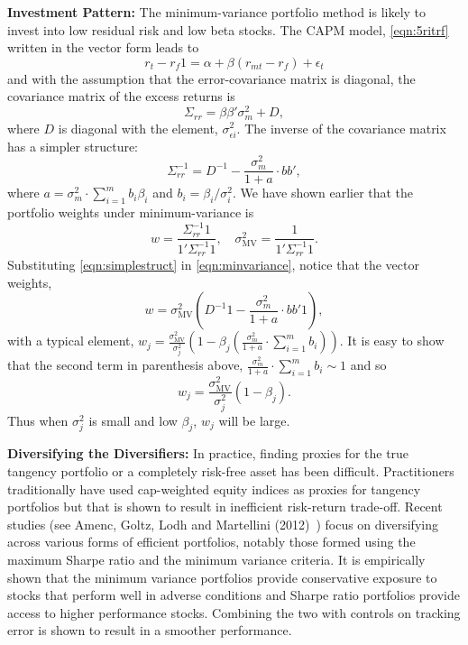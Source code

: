 \noindent\textbf{Investment Pattern:} The minimum-variance portfolio method is likely to invest into low residual risk and low beta stocks. The CAPM model, \eqref{eqn:5ritrf} written in the vector form leads to
	\begin{equation}\label{eqn:vectorform}
	r_t - r_f 1 = \alpha + \beta(r_{mt} - r_f) + \epsilon_t
	\end{equation}
and with the assumption that the error-covariance matrix is diagonal, the covariance matrix of the excess returns is
	\begin{equation}\label{eqn:Sigmarr}
	\Sigma_{rr}= \beta\beta' \sigma_m^2 + D,
	\end{equation}	
where $D$ is diagonal with the element, $\sigma_{\epsilon i}^2$. The inverse of the covariance matrix has a simpler structure:
	\begin{equation}\label{eqn:simplestruct}
	\Sigma_{rr}^{-1}= D^{-1} - \dfrac{\sigma_m^2}{1+a} \cdot bb',
	\end{equation}	
where $a=\sigma_m^2 \cdot \sum_{i=1}^m b_i \beta_i$ and $b_i= \beta_i/\sigma_i^2$. We have shown earlier that the portfolio weights under minimum-variance is
	\begin{equation} \label{eqn:minvariance}
	w= \dfrac{\Sigma_{rr}^{-1} 1}{1' \Sigma_{rr}^{-1} 1}, \quad \sigma_{\text{MV}}^2= \dfrac{1}{1' \Sigma_{rr}^{-1} 1}.
	\end{equation}	
Substituting \eqref{eqn:simplestruct} in \eqref{eqn:minvariance}, notice that the vector weights,
	\begin{equation}  \label{eqn:wsubtitute}
	w= \sigma_{\text{MV}}^2 \left( D^{-1} 1 - \dfrac{\sigma_m^2}{1+a} \cdot bb' 1\right),
	\end{equation}
with a typical element, $w_j= \frac{\sigma_{\text{MV}}^2}{\sigma_j^2} \left(1 - \beta_j \left( \frac{\sigma_m^2}{1+a} \cdot \sum_{i=1}^m b_i \right) \right)$. It is easy to show that the second term in parenthesis above, $\frac{\sigma_m^2}{1+a} \cdot \sum_{i=1}^m b_i \sim 1$ and so
	\begin{equation} \label{eqn:wsubsecond}
	w_j= \dfrac{\sigma_{\text{MV}}^2}{\sigma_j^2} ( 1- \beta_j).
	\end{equation}
Thus when $\sigma_j^2$ is small and low $\beta_j$, $w_j$ will be large. \twomedskip


\noindent\textbf{Diversifying the Diversifiers:} In practice, finding proxies for the true tangency portfolio or a completely risk-free asset has been difficult. Practitioners traditionally have used cap-weighted equity indices as proxies for tangency portfolios but that is shown to result in inefficient risk-return trade-off. Recent studies (see Amenc, Goltz, Lodh and Martellini (2012)~\cite{amencgoltzlodhmart}) focus on diversifying across various forms of efficient portfolios, notably those formed using the maximum Sharpe ratio and the minimum variance criteria. It is empirically shown that the minimum variance portfolios provide conservative exposure to stocks that perform well in adverse conditions and Sharpe ratio portfolios provide access to higher performance stocks. Combining the two with controls on tracking error is shown to result in a smoother performance. 



